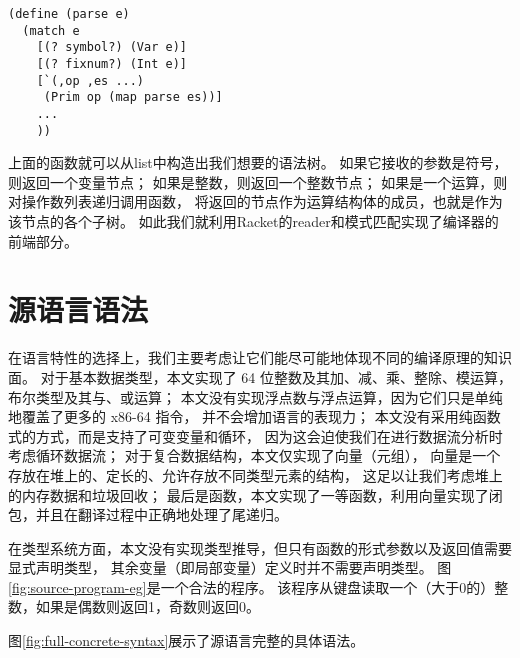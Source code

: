 \begin{multilinecode}
\begin{lstlisting}
(define (parse e)
  (match e
    [(? symbol?) (Var e)]
    [(? fixnum?) (Int e)]
    [`(,op ,es ...)
     (Prim op (map parse es))]
    ...
    ))
\end{lstlisting}
\end{multilinecode}

上面的函数就可以从list中构造出我们想要的语法树。
如果它接收的参数是符号，则返回一个变量节点；
如果是整数，则返回一个整数节点；
如果是一个运算，则对操作数列表递归调用函数，
将返回的节点作为运算结构体的成员，也就是作为该节点的各个子树。
如此我们就利用Racket的reader和模式匹配实现了编译器的前端部分。

\section{源语言语法}

在语言特性的选择上，我们主要考虑让它们能尽可能地体现不同的编译原理的知识面。
对于基本数据类型，本文实现了 64 位整数及其加、减、乘、整除、模运算，布尔类型及其与、或运算；
本文没有实现浮点数与浮点运算，因为它们只是单纯地覆盖了更多的 x86-64 指令，
并不会增加语言的表现力；
本文没有采用纯函数式的方式，而是支持了可变变量和循环，
因为这会迫使我们在进行数据流分析时考虑循环数据流；
对于复合数据结构，本文仅实现了向量（元组），
向量是一个存放在堆上的、定长的、允许存放不同类型元素的结构，
这足以让我们考虑堆上的内存数据和垃圾回收；
最后是函数，本文实现了一等函数，利用向量实现了闭包，并且在翻译过程中正确地处理了尾递归。

在类型系统方面，本文没有实现类型推导，但只有函数的形式参数以及返回值需要显式声明类型，
其余变量（即局部变量）定义时并不需要声明类型。
图\ref{fig:source-program-eg}是一个合法的程序。
该程序从键盘读取一个（大于0的）整数，如果是偶数则返回1，奇数则返回0。


图\ref{fig:full-concrete-syntax}展示了源语言完整的具体语法。



